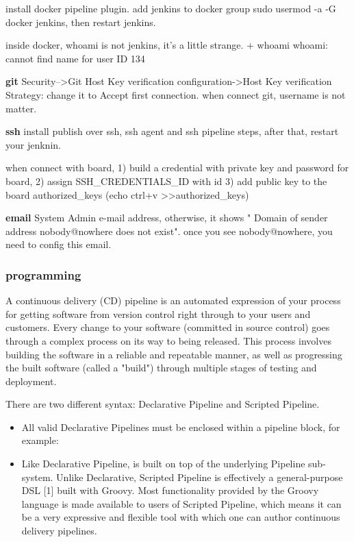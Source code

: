 \documentclass[paper=8.5in:11in, twoside, 12pt, pagesize=pdftex]{book}
\begin{document}
install docker pipeline plugin. 
add jenkins to docker group sudo usermod -a -G docker jenkins, then restart jenkins.

inside docker, whoami is not jenkins, it's a little strange. 
+ whoami
whoami: cannot find name for user ID 134


\textbf{git}
Security-->Git Host Key verification configuration->Host Key verification Strategy: change it to Accept first connection. when connect git, username is not matter. 


\textbf{ssh}
install publish over ssh, ssh agent  and ssh pipeline steps, after that, restart your jenknin. 

when connect with board, 1) build a credential with private key and password for board, 2) assign SSH\_CREDENTIALS\_ID with id 3) add public key to the board authorized\_keys (echo ctrl+v >>authorized\_keys)


\textbf{email}
System Admin e-mail address, otherwise, it shows " Domain of sender address nobody@nowhere does not exist". once you see nobody@nowhere, you need to config this email. 

\subsubsection{programming}
A continuous delivery (CD) pipeline is an automated expression of your process for getting software from version control right through to your users and customers. Every change to your software (committed in source control) goes through a complex process on its way to being released. This process involves building the software in a reliable and repeatable manner, as well as progressing the built software (called a "build") through multiple stages of testing and deployment.

There are two different syntax: Declarative Pipeline and Scripted Pipeline.
\begin{itemize}
	\item All valid Declarative Pipelines must be enclosed within a pipeline block, for example:
	
	\item Like Declarative Pipeline, is built on top of the underlying Pipeline sub-system. Unlike Declarative, Scripted Pipeline is effectively a general-purpose DSL [1] built with Groovy. Most functionality provided by the Groovy language is made available to users of Scripted Pipeline, which means it can be a very expressive and flexible tool with which one can author continuous delivery pipelines.	  
\end{itemize}
\end{document}

